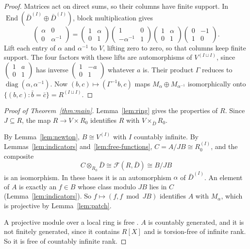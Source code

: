 \documentclass[11pt,a4paper]{article}
\theoremstyle{plain}
\theoremstyle{remark}
\newcommand{\Fn}{\mathcal F}
\begin{document}
\begin{proof}
Matrices act on direct sums, so their columns have finite support. In $\operatorname{End}(\bar D^{(I)}\oplus\bar
D^{(I)})$, block multiplication gives
\[
 \begin{pmatrix}\alpha&0\\0&\alpha^{-1}\end{pmatrix}
 =\begin{pmatrix}1&\alpha\\0&1\end{pmatrix}
 \begin{pmatrix}1&0\\-\alpha^{-1}&1\end{pmatrix}
 \begin{pmatrix}1&\alpha\\0&1\end{pmatrix}
 \begin{pmatrix}0&-1\\1&0\end{pmatrix}.
\]
Lift each entry of $\alpha$ and $\alpha^{-1}$ to $V$, lifting zero to zero, so that columns keep finite support.
The four factors with these lifts are automorphisms of $V^{(I\sqcup I)}$, since $\begin{pmatrix}1&a\\0&1\end{pmatrix}$
has inverse $\begin{pmatrix}1&-a\\0&1\end{pmatrix}$ whatever $a$ is. Their product $\Gamma$ reduces to
$\operatorname{diag}(\alpha,\alpha^{-1})$. Now $(b,c)\mapsto(\Gamma^{-1}b,c)$ maps $M_\alpha\oplus M_{\alpha^{-1}}$
isomorphically onto $\{(b,c):\bar b=\bar c\}=R^{(I\sqcup I)}$.
\end{proof}

\begin{proof}[Proof of Theorem~\ref{thm:main}]
Lemma~\ref{lem:ring} gives the properties of $R$. Since $J\subseteq R$, the map $R\to V\times R_0$ identifies $R$
with $V\times_{\bar D}R_0$.

By Lemma~\ref{lem:newton}, $B\cong V^{(I)}$ with $I$ countably infinite. By Lemmas~\ref{lem:indicators}
and~\ref{lem:free-functions}, $C=A/JB\cong R_0^{(I)}$, and the composite
\[
 C\otimes_{R_0}\bar D\cong\Fn(R,\bar D)\cong B/JB
\]
is an isomorphism. In these bases it is an automorphism $\alpha$ of $\bar D^{(I)}$. An element of $A$ is exactly an
$f\in B$ whose class modulo $JB$ lies in $C$ (Lemma~\ref{lem:indicators}). So $f\mapsto(f,f\bmod JB)$ identifies $A$
with $M_\alpha$, which is projective by Lemma~\ref{lem:patch}.

A projective module over a local ring is free \cite[Theorem~2]{Kap}. $A$ is countably generated, and it is not
finitely generated, since it contains $R[X]$ and is torsion-free of infinite rank. So it is free of countably
infinite rank.
\end{proof}
\end{document}
